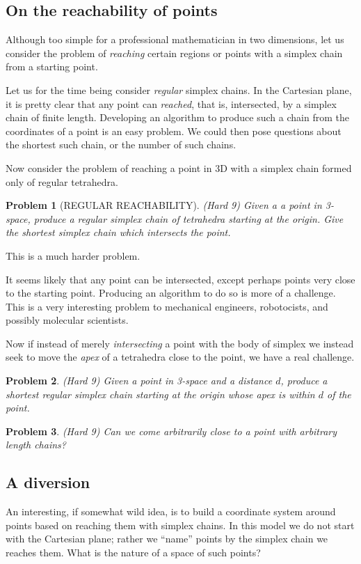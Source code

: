 \documentclass[11pt]{article}
\newtheorem{problem}{Problem}
\begin{document}
\subsection{On the reachability of points}

Although too simple for a professional mathematician in two dimensions, let us consider the problem of {\em reaching} certain regions
or points with a simplex chain from a starting point.

Let us for the time being consider {\em regular} simplex chains.  In the Cartesian plane, it is pretty clear that any point can {\em reached},
that is, intersected, by a simplex chain of finite length. Developing an algorithm to produce such a chain from the coordinates of a point
is an easy problem. We could then pose questions about the shortest such chain, or the number of such chains.

Now consider the problem of reaching a point in 3D with a simplex chain formed only of regular tetrahedra.
\begin{problem}[REGULAR REACHABILITY]
  (Hard 9)  Given a a point in 3-space, produce a regular simplex chain of tetrahedra starting at the origin.
  Give the shortest simplex chain which intersects the point.
\end{problem}
This is a much harder problem.

It seems likely that any point can be intersected, except perhaps points very close to the starting point. Producing an algorithm to do so
is more of a challenge. This is a very interesting problem to mechanical engineers, robotocists, and possibly molecular scientists.

Now if instead of merely {\em intersecting} a point with the body of simplex we instead seek to move the {\em apex} of a tetrahedra close
to the point, we have a real challenge.
\begin{problem}
  (Hard 9) Given a point in 3-space and a distance $d$, produce a shortest regular simplex chain starting at the origin whose apex
  is within $d$ of the point.
\end{problem}

\begin{problem}
(Hard 9) Can we come arbitrarily close to a point with arbitrary length chains?
\end{problem}

\subsection{A diversion}
An interesting, if somewhat wild idea, is to build a coordinate system around points based on reaching them with simplex chains. In this model
we do not start with the Cartesian plane; rather we ``name'' points by the simplex chain we reaches them. What is the nature of a space
of such points? 
\end{document}
